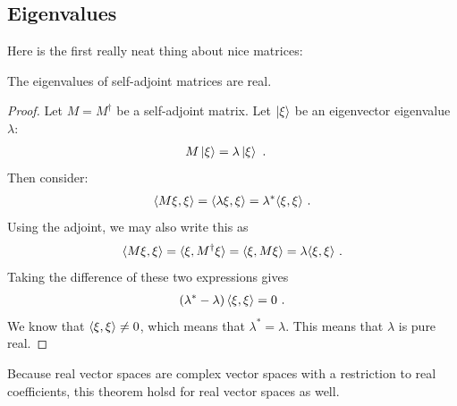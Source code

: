 \documentclass[12pt, oneside]{report}    %
\begin{document}




\subsection{Eigenvalues}

Here is the first really neat thing about nice matrices:
\begin{theorem}
The eigenvalues of self-adjoint matrices are real.
\end{theorem}
\begin{proof}
Let $M=M^\dag$ be a self-adjoint matrix. Let $\left|\xi\right\rangle$ be  an eigenvector eigenvalue $\lambda$:
\begin{align}
    M\left|\xi\right\rangle &= \lambda\left|\xi\right\rangle 
    \ .
\end{align}
Then consider:
\begin{align}
    \langle M \xi, \xi \rangle 
    = 
    \langle \lambda \xi, \xi \rangle
    = 
    \lambda^* \langle \xi, \xi \rangle \ .
\end{align}
Using the adjoint, we may also write this as
\begin{align}
    \langle M \xi, \xi \rangle 
    = 
    \langle \xi, M^\dag \xi \rangle
    =
    \langle \xi, M \xi \rangle
    = 
    \lambda \langle \xi, \xi \rangle \ .
\end{align}
Taking the difference of these two expressions gives
\begin{align}
    \left(\lambda^*-\lambda\right) \langle \xi, \xi \rangle  = 0 \ .
\end{align}
We know that $ \langle \xi, \xi \rangle\neq 0$, which means that $\lambda^* = \lambda$. This means that $\lambda$ is pure real. 
\end{proof}
Because real vector spaces are complex vector spaces with  a restriction to real coefficients, this theorem holsd for real vector spaces as well. 
\end{document}
